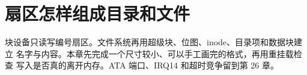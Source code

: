 \chapter{扇区怎样组成目录和文件}

块设备只读写编号扇区。文件系统再用超级块、位图、inode、目录项和数据块建立
名字与内容。本章先完成一个尺寸较小、可以手工画完的格式，再用重挂载检查
写入是否真的离开内存。ATA 端口、IRQ14 和超时竞争留到第 26 章。



